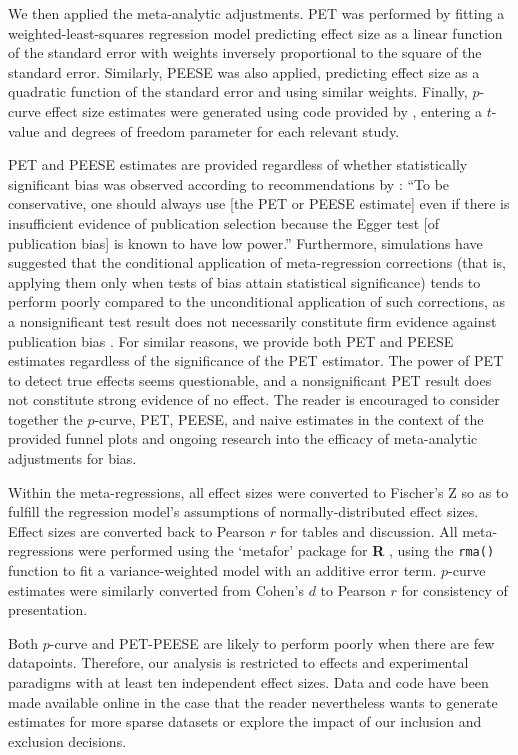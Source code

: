 \documentclass[man]{apa6}
\begin{document}
We then applied the meta-analytic adjustments. PET was performed by fitting a weighted-least-squares regression model predicting effect size as a linear function of the standard error with weights inversely proportional to the square of the standard error. Similarly, PEESE was also applied, predicting effect size as a quadratic function of the standard error and using similar weights. Finally, $p$-curve effect size estimates were generated using code provided by \citet{Simonsohn:etal:2014}, entering a $t$-value and degrees of freedom parameter for each relevant study.

PET and PEESE estimates are provided regardless of whether statistically significant bias was observed according to recommendations by \citet[p. 20-21]{Stanley:Doucouliagos:2013}: ``To be conservative, one should always use [the PET or PEESE estimate] even if there is insufficient evidence of publication selection because the Egger test [of publication bias] is known to have low power.'' Furthermore, simulations have suggested that the conditional application of meta-regression corrections (that is, applying them only when tests of bias attain statistical significance) tends to perform poorly compared to the unconditional application of such corrections, as a nonsignificant test result does not necessarily constitute firm evidence against publication bias \citep{Moreno:etal:2006}. For similar reasons, we provide both PET and PEESE estimates regardless of the significance of the PET estimator. The power of PET to detect true effects seems questionable, and a nonsignificant PET result does not constitute strong evidence of no effect. The reader is encouraged to consider together the $p$-curve, PET, PEESE, and naive estimates in the context of the provided funnel plots and ongoing research into the efficacy of meta-analytic adjustments for bias.

Within the meta-regressions, all effect sizes were converted to Fischer's Z so as to fulfill the regression model's assumptions of normally-distributed effect sizes. Effect sizes are converted back to Pearson $r$ for tables and discussion. All meta-regressions were performed using the `metafor' package for {\bf R} \citep{Viechtbauer:2010}, using the {\tt rma()} function to fit a variance-weighted model with an additive error term. $p$-curve estimates were similarly converted from Cohen's $d$ to Pearson $r$ for consistency of presentation.

Both $p$-curve and PET-PEESE are likely to perform poorly when there are few datapoints. Therefore, our analysis is restricted to effects and experimental paradigms with at least ten independent effect sizes. %
Data and code have been made available online in the case that the reader nevertheless wants to generate estimates for more sparse datasets or explore the impact of our inclusion and exclusion decisions. %
\end{document}
